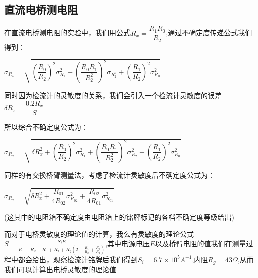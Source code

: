 \documentclass[a4 paper,12pt]{article}
\begin{document}
\subsection{直流电桥测电阻}
在直流电桥测电阻的实验中，我们用公式$R_{x}=\dfrac{R_{1}R_{0}}{R_{2}}$,通过不确定度传递公式我们得到：
\begin{center}
	$\sigma_{R_{x}}=\sqrt{(\dfrac{R_{0}}{R_{2}})^{2}\sigma_{R_{1}}^{2}+(\dfrac{R_{0}R_{1}}{R_{2}^{2}})^{2}\sigma_{R_{2}^{2}}+(\dfrac{R_{1}}{R_{2}})^{2}\sigma_{R_{0}}^{2}}$
\end{center}
\par 同时因为检流计的灵敏度的关系，我们会引入一个检流计灵敏度的误差$\delta R_{x}=\dfrac{0.2R_{x}}{S}$\\
\par 所以综合不确定度公式为：
\begin{center}
	$\sigma_{R_{x}}=\sqrt{\delta R_{x}^{2}+(\dfrac{R_{0}}{R_{2}})^{2}\sigma_{R_{1}}^{2}+(\dfrac{R_{0}R_{1}}{R_{2}^{2}})^{2}\sigma_{R_{2}}^{2}+(\dfrac{R_{1}}{R_{2}})^{2}\sigma_{R_{0}}^{2}}$
\end{center}
\par 同样的有交换桥臂测量法，考虑了检流计灵敏度后不确定度公式为：
\begin{center}
	$\sigma_{R_{x}}=\sqrt{\delta R_{x}^{2}+\dfrac{R_{01}}{4R_{02}}\sigma_{R_{02}}^{2}+\dfrac{R_{02}}{4R_{01}}\sigma_{R_{01}}^{2}}$
\end{center}
\par (这其中的电阻箱不确定度由电阻箱上的铭牌标记的各档不确定度等级给出)
\par 而对于电桥灵敏度的理论值的计算，我么有灵敏度的理论公式$S=\frac{S_{i}E}{R_{1}+R_{2}+R_{0}+R_{x}+R_{g}(2+\frac{R_{1}}{R_{x}}+\frac{R_{0}}{R_{2}})}$,其中电源电压$E$以及桥臂电阻的值我们在测量过程中都会给出，观察检流计铭牌后我们得到$S_{i}=6.7\times10^{5}A^{-1}$,内阻$R_{g}=43\Omega$,从而我们可以计算出电桥灵敏度的理论值
\end{document}
